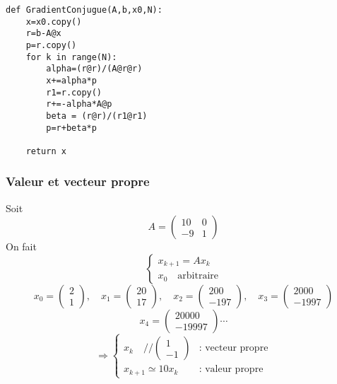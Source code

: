 \documentclass{beamer}
\begin{document}

\begin{frame}[fragile]

\begin{verbatim}
def GradientConjugue(A,b,x0,N):
    x=x0.copy()
    r=b-A@x
    p=r.copy()
    for k in range(N):
        alpha=(r@r)/(A@r@r)
        x+=alpha*p
        r1=r.copy()
        r+=-alpha*A@p
        beta = (r@r)/(r1@r1)
        p=r+beta*p
        
    return x

\end{verbatim}
\end{frame}
\begin{frame}
\frametitle{Valeur et vecteur propre}
Soit
\[A=\left(\begin{array}{cc}
10&0\\
-9&1
\end{array}\right)
\]
On fait \[\left\{\begin{array}{l}
x_{k+1}=A x_k\\
x_0\quad \mbox{arbitraire}
\end{array}\right.
\]
\[x_0=\left(\begin{array}{c}
2\\
1
\end{array}\right),\quad
x_1=\left(\begin{array}{c}
20\\
17
\end{array}\right),\quad
x_2=\left(\begin{array}{c}
200\\
-197
\end{array}\right),\quad
x_3=\left(\begin{array}{c}
2000\\
-1997
\end{array}\right)
\]
\[x_4=\left(\begin{array}{c}
20000\\
-19997
\end{array}\right) \cdots
\]
\[\Longrightarrow \left\{\begin{array}{ll}
x_k\quad // \left(\begin{array}{c}
1\\
-1
\end{array}\right) & \mbox{: vecteur propre}\\
x_{k+1}\simeq 10 x_k & \mbox{: valeur propre}
\end{array}\right.
\]
\end{frame}
\end{document}
